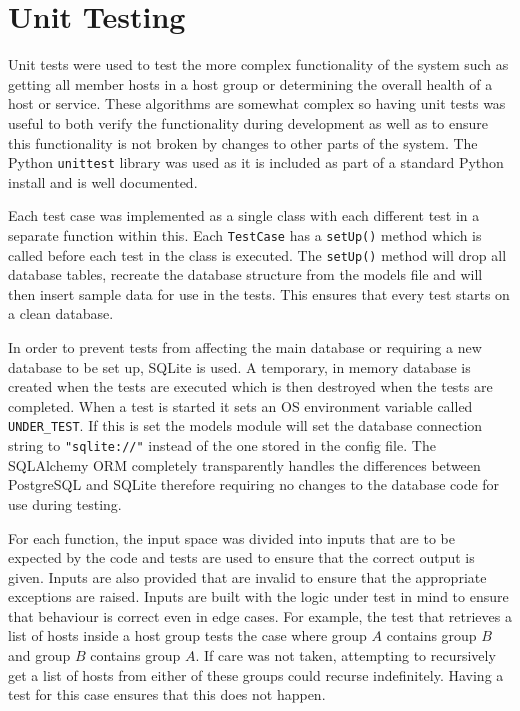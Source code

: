 \documentclass[bsc,deptreport,twoside,parskip,singlespacing,notimes]{infthesis}
\begin{document}
\section{Unit Testing}

	Unit tests were used to test the more complex functionality of the system such
	as getting all member hosts in a host group or determining the overall health
	of a host or service.  These algorithms are somewhat complex so having unit
	tests was useful to both verify the functionality during development as well
	as to ensure this functionality is not broken by changes to other parts of the
	system.  The Python \texttt{unittest} library was used as it is included as part of
	a standard Python install and is well documented.


	Each test case was implemented as a single class with each different test in a
	separate function within this.  Each \texttt{TestCase} has a \texttt{setUp()}
	method which is called before each test in the class is executed.  The
	\texttt{setUp()} method will drop all database tables, recreate the database
	structure from the models file and will then insert sample data for use in the
	tests.  This ensures that every test starts on a clean database.


	In order to prevent tests from affecting the main database or requiring a new
	database to be set up, SQLite is used.  A temporary, in memory database is
	created when the tests are executed which is then destroyed when the tests are
	completed.  When a test is started it sets an OS environment variable called
	\texttt{UNDER\_TEST}.  If this is set the models module will set the database
	connection string to \texttt{"sqlite://"} instead of the one stored in the config
	file. The SQLAlchemy ORM completely transparently handles the differences
	between PostgreSQL and SQLite therefore requiring no changes to the database
	code for use during testing.
	
	For each function, the input space was divided into inputs that are to be
	expected by the code and tests are used to ensure that the correct output is
	given.  Inputs are also provided that are invalid to ensure that the
	appropriate exceptions are raised.  Inputs are built with the logic under
	test in mind to ensure that behaviour is correct even in edge cases.  For
	example, the test that retrieves a list of hosts inside a host group tests
	the case where group $A$ contains group $B$ and group $B$ contains group $A$.
	If care was not taken, attempting to recursively get a list of hosts from
	either of these groups
	could recurse indefinitely.  Having a test for this case ensures that this does
	not happen.
\end{document}
